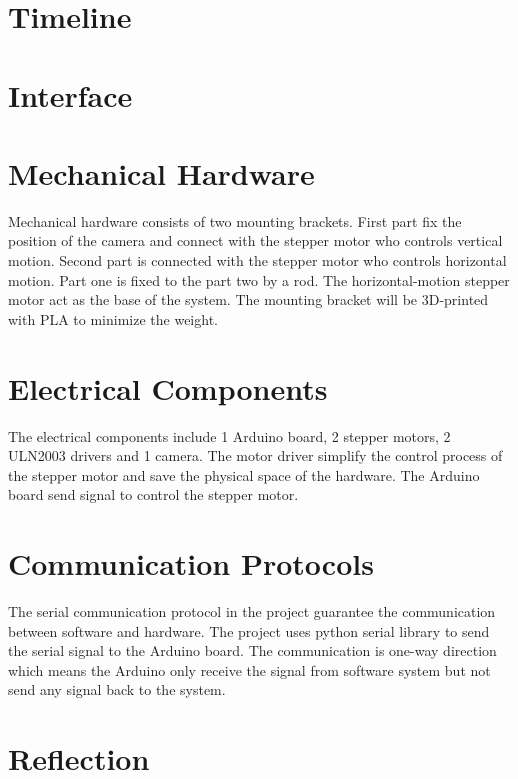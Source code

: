\documentclass[12pt, titlepage]{article}
\begin{document}
\section{Timeline}


% 

\newpage{}

\appendix

\section{Interface}


\section{Mechanical Hardware}
Mechanical hardware consists of two mounting brackets. First part fix the position of the camera and connect with the stepper motor who controls vertical motion. Second part is connected with the stepper motor who controls horizontal motion. Part one is fixed to the part two by a rod. The horizontal-motion stepper motor act as the base of the system. The mounting bracket will be 3D-printed with PLA to minimize the weight.

\section{Electrical Components}
The electrical components include 1 Arduino board, 2 stepper motors, 2 ULN2003 drivers and 1 camera. The motor driver simplify the control process of the stepper motor and save the physical space of the hardware. The Arduino board send signal to control the stepper motor.
\section{Communication Protocols}
The serial communication protocol in the project guarantee the communication between software and hardware. The project uses python serial library to send the serial signal to the Arduino board. The communication is one-way direction which means the Arduino only receive the signal from software system but not send any signal back to the system.
\section{Reflection}
\end{document}
